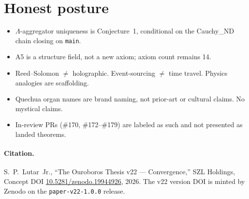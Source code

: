 \documentclass[11pt]{article}
\newcommand{\Lam}{\ensuremath{\Lambda}}
\begin{document}
\section{Honest posture}
\begin{itemize}\setlength\itemsep{0pt}
  \item \Lam-aggregator uniqueness is Conjecture~1, conditional on the Cauchy\_ND chain closing on \texttt{main}.
  \item A5 is a structure field, not a new axiom; axiom count remains 14.
  \item Reed--Solomon $\neq$ holographic. Event-sourcing $\neq$ time travel. Physics analogies are scaffolding.
  \item Quechua organ names are brand naming, not prior-art or cultural claims. No mystical claims.
  \item In-review PRs (\#170, \#172--\#179) are labeled as such and not presented as landed theorems.
\end{itemize}

\paragraph{Citation.} S.~P.~Lutar~Jr., ``The Ouroboros Thesis v22 --- Convergence,'' SZL Holdings,
Concept DOI \href{https://doi.org/10.5281/zenodo.19944926}{10.5281/zenodo.19944926}, 2026. The v22
version DOI is minted by Zenodo on the \texttt{paper-v22-1.0.0} release.



\end{document}
